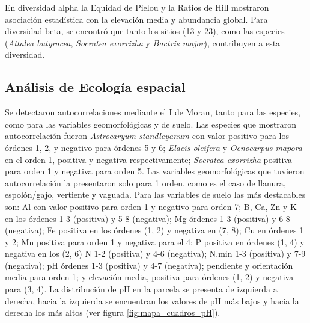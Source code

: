 \documentclass[11pt,]{article}
\begin{document}
En diversidad alpha la Equidad de Pielou y la Ratios de Hill mostraron
asociación estadística con la elevación media y abundancia global. Para
diversidad beta, se encontró que tanto los sitios (13 y 23), como las
especies (\emph{Attalea butyracea}, \emph{Socratea exorrizha} y
\emph{Bactris major}), contribuyen a esta diversidad.

\subsection{Análisis de Ecología
espacial}\label{anuxe1lisis-de-ecologuxeda-espacial-1}

Se detectaron autocorrelaciones mediante el I de Moran, tanto para las
especies, como para las variables geomorfológicas y de suelo. Las
especies que mostraron autocorrelación fueron \emph{Astrocaryum
standleyanum} con valor positivo para los órdenes 1, 2, y negativo para
órdenes 5 y 6; \emph{Elaeis oleifera} y \emph{Oenocarpus mapora} en el
orden 1, positiva y negativa respectivamente; \emph{Socratea exorrizha}
positiva para orden 1 y negativa para orden 5. Las variables
geomorfológicas que tuvieron autocorrelación la presentaron solo para 1
orden, como es el caso de llanura, espolón/gajo, vertiente y vaguada.
Para las variables de suelo las más destacables son: Al con valor
positivo para orden 1 y negativo para orden 7; B, Ca, Zn y K en los
órdenes 1-3 (positiva) y 5-8 (negativa); Mg órdenes 1-3 (positiva) y 6-8
(negativa); Fe positiva en los órdenes (1, 2) y negativa en (7, 8); Cu
en órdenes 1 y 2; Mn positiva para orden 1 y negativa para el 4; P
positiva en órdenes (1, 4) y negativa en los (2, 6) N 1-2 (positiva) y
4-6 (negativa); N.min 1-3 (positiva) y 7-9 (negativa); pH órdenes 1-3
(positiva) y 4-7 (negativa); pendiente y orientación media para orden 1;
y elevación media, positiva para órdenes (1, 2) y negativa para (3, 4).
La distribución de pH en la parcela se presenta de izquierda a derecha,
hacia la izquierda se encuentran los valores de pH más bajos y hacia la
derecha los más altos (ver figura \ref{fig:mapa_cuadros_pH}).
\end{document}
